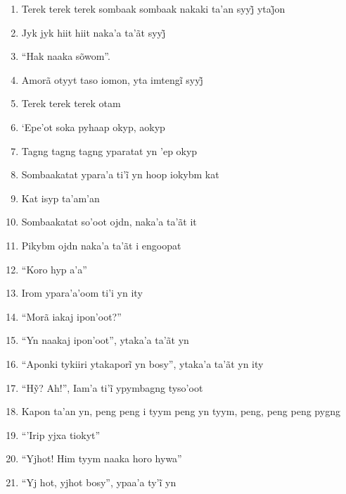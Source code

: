 \begin{enumerate}
 \item Terek terek terek sombaak sombaak nakaki ta’an syyj̃ ytaj̃on

 \item Jyk jyk hiit hiit naka’a ta’ãt syyj̃

 \item ``Hak naaka sõwom''.

 \item Amorã otyyt taso iomon, yta imtengĩ syyj̃

 \item Terek terek terek otam

 \item `Epe'ot soka pyhaap okyp, aokyp

 \item Tagng tagng tagng yparatat yn 'ep okyp

 \item Sombaakatat ypara’a ti’ĩ yn hoop iokybm kat

 \item Kat isyp ta'am'an

 \item Sombaakatat so'oot ojdn, naka'a ta'ãt it

 \item Pikybm ojdn naka'a ta'ãt i engoopat

 \item ``Koro hyp a'a''

 \item Irom ypara'a'oom ti'i yn ity

 \item ``Morã iakaj ipon'oot?''

 \item ``Yn naakaj ipon'oot'', ytaka'a ta'ãt yn

 \item ``Aponki tykiiri ytakaporĩ yn bosy'', ytaka’a ta’ãt yn ity

 \item ``Hỹ? Ah!'', Iam’a ti’ĩ ypymbagng tyso’oot

 \item Kapon ta'an yn, peng peng i tyym peng yn tyym, peng, peng peng pygng

 \item ``'Irip yjxa tiokyt''

 \item ``Yjhot! Him tyym naaka horo hywa''

 \item ``Yj hot, yjhot bosy'', ypaa’a ty’ĩ yn


\end{enumerate}

